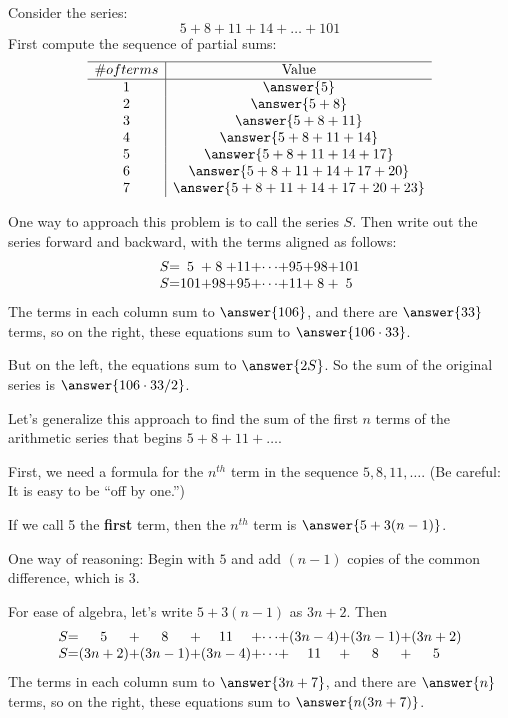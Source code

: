 \documentclass[nooutcomes]{ximera}
\begin{document}
\begin{problem}
Consider the series: 
\[
5+8+11+14+\dots+101
\]
First compute the sequence of partial sums: 
\[
\begin{array}{c|c} \hline
\# of terms & \text{Value} \\ \hline
1 & \answer{5} \\
2 & \answer{5+8} \\
3 & \answer{5+8+11}\\
4 & \answer{5+8+11+14}\\
5 & \answer{5+8+11+14+17}\\
6 & \answer{5+8+11+14+17+20}\\
7 & \answer{5+8+11+14+17+20+23}\\
\end{array}
\]

\begin{problem}
One way to approach this problem is to call the series $S$.  Then write out the series forward and backward, with the terms aligned as follows:  
\[
\begin{array}{c@{ = }c@{ + }c@{ + }c@{ + }c@{ + }c@{ + }c@{ + }c}
S & 5 & 8 & 11 & \cdots & 95 & 98 & 101 \\
S & 101 & 98 & 95 & \cdots & 11 & 8 & 5 
\end{array}
\]
The terms in each column sum to $\answer{106}$, and there are $\answer{33}$ terms, so on the right, these equations sum to $\answer{106\cdot 33}$.  

But on the left, the equations sum to $\answer{2S}$.  So the sum of the original series is 
$\answer{106\cdot 33/2}$. 

\begin{problem}
Let's generalize this approach to find the sum of the first $n$ terms of the arithmetic series that begins $5+8+11+\dots$.  

First, we need a formula for the $n^{th}$ term in the sequence $5, 8, 11, \dots$.  (Be careful:  It is easy to be ``off by one.'')

If we call 5 the \textbf{first} term, then the $n^{th}$ term is $\answer{5+3(n-1)}$.  
\begin{feedback}
One way of reasoning:  Begin with $5$ and add $(n-1)$ copies of the common difference, which is $3$.  
\end{feedback}

\begin{problem}
For ease of algebra, let's write $5+3(n-1)$ as $3n+2$.  Then 
\[
\begin{array}{c@{ = }c@{ + }c@{ + }c@{ + }c@{ + }c@{ + }c@{ + }c}
S & 5 & 8 & 11 & \cdots & (3n-4) & (3n-1) & (3n+2) \\
S & (3n+2) & (3n-1) & (3n-4) & \cdots & 11 & 8 & 5 
\end{array}
\]
The terms in each column sum to $\answer{3n+7}$, and there are $\answer{n}$ terms, so on the right, these equations sum to $\answer{n(3n+7)}$.  


\end{problem}
\end{problem}
\end{problem}
\end{problem}
\end{document}
